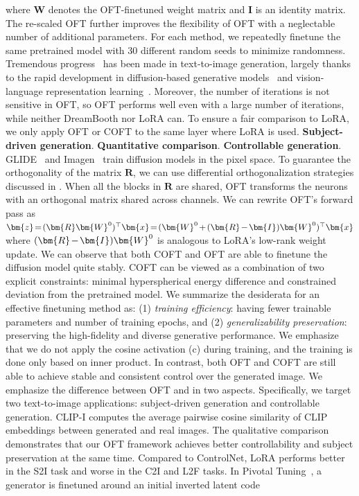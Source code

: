 \begin{itemize}[leftmargin=*,nosep]
\begin{itemize}[leftmargin=*,nosep]
where $\bm{W}$ denotes the OFT-finetuned weight matrix and $\bm{I}$ is an identity matrix. The re-scaled OFT further improves the flexibility of OFT with a neglectable number of additional parameters. For each method, we repeatedly finetune the same pretrained model with 30 different random seeds to minimize randomness. Tremendous progress~\cite{saharia2022photorealistic,ramesh2022hierarchical,rombach2022high,gu2022vector,nichol2022glide} has been made in text-to-image generation, largely thanks to the rapid development in diffusion-based generative models~\cite{ho2020denoising,song2021score,song2021denoising,dhariwal2021diffusion} and vision-language representation learning~\cite{su2020vlbert,lu2019vilbert,radford2021learning,wang2021simvlm,li2022blip,li2023blip,alayrac2022flamingo,schuhmann2022laion}. Moreover, the number of iterations is not sensitive in OFT, so OFT performs well even with a large number of iterations, while neither DreamBooth nor LoRA can. To ensure a fair comparison to LoRA, we only apply OFT or COFT to the same layer where LoRA is used. \textbf{Subject-driven generation}. \textbf{Quantitative comparison}. \textbf{Controllable generation}. GLIDE~\cite{nichol2022glide} and Imagen~\cite{saharia2022photorealistic} train diffusion models in the pixel space. To guarantee the orthogonality of the matrix $\bm{R}$, we can use differential orthogonalization strategies discussed in \cite{liu2021orthogonal,lezcano2019cheap}. When all the blocks in $\bm{R}$ are shared, OFT transforms the neurons with an orthogonal matrix shared across channels. We can rewrite OFT's forward pass as $\thickmuskip=2mu \medmuskip=2mu \bm{z}=(\bm{R}\bm{W}^0)^\top\bm{x}=(\bm{W}^0+(\bm{R}-\bm{I})\bm{W}^0)^\top\bm{x}$ where $\thickmuskip=2mu \medmuskip=2mu (\bm{R}-\bm{I})\bm{W}^0$ is analogous to LoRA's low-rank weight update. We can observe that both COFT and OFT are able to finetune the diffusion model quite stably. COFT can be viewed as a combination of two explicit constraints: minimal hyperspherical energy difference and constrained deviation from the pretrained model. We summarize the desiderata for an effective finetuning method as: (1) \emph{training efficiency}: having fewer trainable parameters and number of training epochs, and (2) \emph{generalizability preservation}: preserving the high-fidelity and diverse generative performance. We emphasize that we do not apply the cosine activation (c) during training, and the training is done only based on inner product. In contrast, both OFT and COFT are still able to achieve stable and consistent control over the generated image. We emphasize the difference between OFT and \cite{liu2021orthogonal} in two aspects. Specifically, we target two text-to-image applications: subject-driven generation and controllable generation. CLIP-I computes the average pairwise cosine similarity of CLIP embeddings between generated and real images. The qualitative comparison demonstrates that our OFT framework achieves better controllability and subject preservation at the same time. Compared to ControlNet, LoRA performs better in the S2I task and worse in the C2I and L2F tasks. In Pivotal Tuning~\cite{roich2022pivotal}, a generator is finetuned around an initial inverted latent code 
\end{itemize}
\end{itemize}
